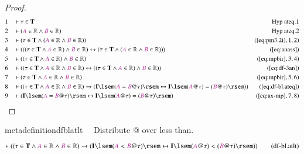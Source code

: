 \begin{proof}
\begin{align}
  1 &&  & \vdash \tau \in \mathbf{T}&\text{Hyp~ateq.1}\notag%
  \\ 2 &&  & \vdash ( \mc{A} \in \mathbb{R} \wedge \mc{B} \in \mathbb{R}
      )&\text{Hyp~ateq.2}\notag%
  \\ 3 &&  & \vdash ( \tau \in \mathbf{T} \wedge ( \mc{A} \in \mathbb{R} \wedge
      \mc{B} \in \mathbb{R} )
      )&(\mbox{\ref{eq:pm3.2i}},1,2)\notag
  \\ 4 &&  & \vdash ( ( ( \tau \in \mathbf{T} \wedge \mc{A} \in \mathbb{R} )
      \wedge \mc{B} \in \mathbb{R} ) \leftrightarrow ( \tau
      \in \mathbf{T} \wedge ( \mc{A} \in \mathbb{R} \wedge
      \mc{B} \in \mathbb{R} ) )
      )&(\mbox{\ref{eq:anass}})\notag
  \\ 5 &&  & \vdash ( ( \tau \in \mathbf{T} \wedge \mc{A} \in \mathbb{R} )
      \wedge \mc{B} \in \mathbb{R}
      )&(\mbox{\ref{eq:mpbir}},3,4)\notag
  \\ 6 &&  & \vdash ( ( \tau \in \mathbf{T} \wedge \mc{A} \in \mathbb{R} \wedge
      \mc{B} \in \mathbb{R} ) \leftrightarrow ( ( \tau \in
      \mathbf{T} \wedge \mc{A} \in \mathbb{R} ) \wedge
      \mc{B} \in \mathbb{R} )
      )&(\mbox{\ref{eq:df-3an}})\notag
  \\ 7 &&  & \vdash ( \tau \in \mathbf{T} \wedge \mc{A} \in \mathbb{R} \wedge
      \mc{B} \in \mathbb{R}
      )&(\mbox{\ref{eq:mpbir}},5,6)\notag
  \\ 8 &&  & \vdash ( ( \tau \in \mathbf{T} \wedge \mc{A} \in \mathbb{R} \wedge
      \mc{B} \in \mathbb{R} ) \rightarrow ( \mathbf{I}
      \lsem ( \mc{A} = \mc{B} @ \tau ) \rsem
      \leftrightarrow \mathbf{I} \lsem ( \mc{A} @ \tau ) =
      ( \mc{B} @ \tau ) \rsem )
      )&(\mbox{\ref{eq:df-bl.ateq}})\notag
  \\ 9 &&  & \vdash ( \mathbf{I} \lsem ( \mc{A} = \mc{B} @ \tau ) \rsem
      \leftrightarrow \mathbf{I} \lsem ( \mc{A} @ \tau ) =
      ( \mc{B} @ \tau ) \rsem
      )&(\mbox{\ref{eq:ax-mp}},7,8)\notag
\end{align}
\end{proof}

\begin{restatable}{metadefinition}{dfblatlt}~~ Distribute @ over less than.
\begin{align}
\vdash ( ( \tau \in \mathbf{T} \wedge \mc{A} \in \mathbb{R} \wedge \mc{B} \in
    \mathbb{R} ) \rightarrow ( \mathbf{I} \lsem ( \mc{A} < \mc{B} @ \tau )
    \rsem \leftrightarrow \mathbf{I} \lsem ( \mc{A} @ \tau ) < ( \mc{B} @ \tau
    ) \rsem ) )\label{eq:df-bl.atlt}\tag{df-bl.atlt}
\end{align}
\end{restatable}

